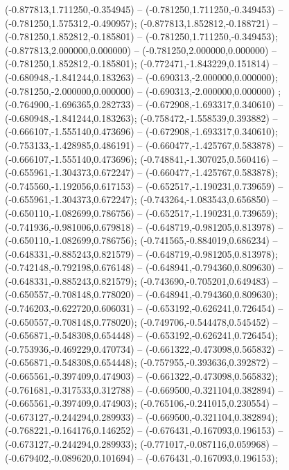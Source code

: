  (-0.877813,1.711250,-0.354945) -- (-0.781250,1.711250,-0.349453) -- (-0.781250,1.575312,-0.490957);
 (-0.877813,1.852812,-0.188721) -- (-0.781250,1.852812,-0.185801) -- (-0.781250,1.711250,-0.349453);
 (-0.877813,2.000000,0.000000) -- (-0.781250,2.000000,0.000000) -- (-0.781250,1.852812,-0.185801);
 (-0.772471,-1.843229,0.151814) -- (-0.680948,-1.841244,0.183263) -- (-0.690313,-2.000000,0.000000);
 (-0.781250,-2.000000,0.000000) -- (-0.690313,-2.000000,0.000000) ;
 (-0.764900,-1.696365,0.282733) -- (-0.672908,-1.693317,0.340610) -- (-0.680948,-1.841244,0.183263);
 (-0.758472,-1.558539,0.393882) -- (-0.666107,-1.555140,0.473696) -- (-0.672908,-1.693317,0.340610);
 (-0.753133,-1.428985,0.486191) -- (-0.660477,-1.425767,0.583878) -- (-0.666107,-1.555140,0.473696);
 (-0.748841,-1.307025,0.560416) -- (-0.655961,-1.304373,0.672247) -- (-0.660477,-1.425767,0.583878);
 (-0.745560,-1.192056,0.617153) -- (-0.652517,-1.190231,0.739659) -- (-0.655961,-1.304373,0.672247);
 (-0.743264,-1.083543,0.656850) -- (-0.650110,-1.082699,0.786756) -- (-0.652517,-1.190231,0.739659);
 (-0.741936,-0.981006,0.679818) -- (-0.648719,-0.981205,0.813978) -- (-0.650110,-1.082699,0.786756);
 (-0.741565,-0.884019,0.686234) -- (-0.648331,-0.885243,0.821579) -- (-0.648719,-0.981205,0.813978);
 (-0.742148,-0.792198,0.676148) -- (-0.648941,-0.794360,0.809630) -- (-0.648331,-0.885243,0.821579);
 (-0.743690,-0.705201,0.649483) -- (-0.650557,-0.708148,0.778020) -- (-0.648941,-0.794360,0.809630);
 (-0.746203,-0.622720,0.606031) -- (-0.653192,-0.626241,0.726454) -- (-0.650557,-0.708148,0.778020);
 (-0.749706,-0.544478,0.545452) -- (-0.656871,-0.548308,0.654448) -- (-0.653192,-0.626241,0.726454);
 (-0.753936,-0.469229,0.470734) -- (-0.661322,-0.473098,0.565832) -- (-0.656871,-0.548308,0.654448);
 (-0.757955,-0.393636,0.392872) -- (-0.665561,-0.397409,0.474903) -- (-0.661322,-0.473098,0.565832);
 (-0.761681,-0.317533,0.312788) -- (-0.669500,-0.321104,0.382894) -- (-0.665561,-0.397409,0.474903);
 (-0.765106,-0.241015,0.230554) -- (-0.673127,-0.244294,0.289933) -- (-0.669500,-0.321104,0.382894);
 (-0.768221,-0.164176,0.146252) -- (-0.676431,-0.167093,0.196153) -- (-0.673127,-0.244294,0.289933);
 (-0.771017,-0.087116,0.059968) -- (-0.679402,-0.089620,0.101694) -- (-0.676431,-0.167093,0.196153);
